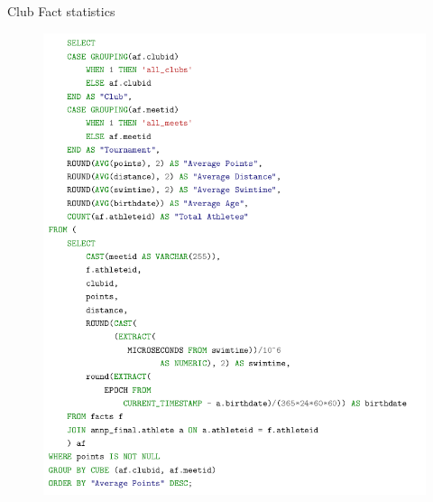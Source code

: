 \documentclass[aspectratio=169, xcolor=dvipsnames]{beamer}
\begin{document}
\begin{frame}{Club Fact statistics}

\begin{figure}
    \includegraphics[scale=0.2]{img/clubstats.png}\hspace*{10cm}
\end{figure}

\end{frame}
\end{document}
